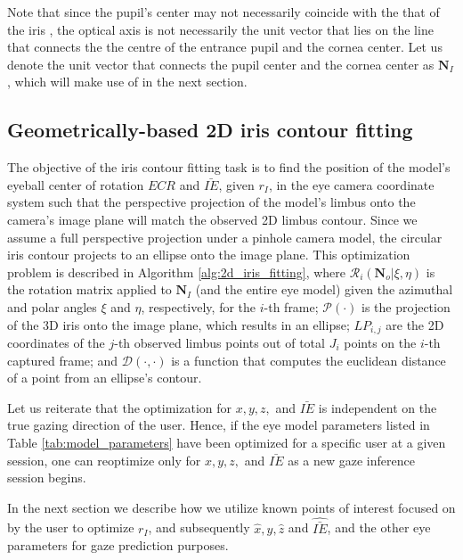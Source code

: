 \documentclass{article}
\begin{document}
Note that since the pupil's center may not necessarily coincide with the that of the iris \citep{Gross2008}, the optical axis is not necessarily the unit vector that lies on the line that connects the the centre of the entrance pupil and the cornea center. Let us denote the unit vector that connects the pupil center and the cornea center as $\textbf{N}_I$, which will make use of in the next section.


\subsection{Geometrically-based 2D iris contour fitting}
 The objective of the iris contour fitting task is to find the position of the model's eyeball center of rotation $ECR$ and $\bar{IE}$, given $r_I$, in the eye camera coordinate system such that the perspective projection of the model's limbus onto the camera's image plane will match the observed 2D limbus contour. Since we assume a full perspective projection under a pinhole camera model, the circular iris contour projects to an ellipse onto the image plane. This optimization problem is described in Algorithm \ref{alg:2d_iris_fitting}, where $\mathcal{R}_i(\textbf{N}_o| \xi, \eta)$ is the rotation matrix applied to $\textbf{N}_I$ (and the entire eye model) given the azimuthal and polar angles $\xi$ and $\eta$, respectively, for the $i$-th frame; $\mathcal{P}(\cdot)$ is the projection of the 3D iris onto the image plane, which results in an ellipse; $LP_{i,j}$ are the 2D coordinates of the $j$-th observed limbus points out of total $J_i$ points on the  $i$-th captured frame; and $\mathcal{D}(\cdot, \cdot)$ is a function that computes the euclidean distance of a point from an ellipse's contour. 

Let us reiterate that the optimization for $x,y,z,$ and $\bar{IE}$ is independent on the true gazing direction of the user.  Hence, if the eye model parameters listed in Table \ref{tab:model_parameters} have been optimized for a specific user at a given session, one can reoptimize only for $x,y,z,$ and $\bar{IE}$ as a new gaze inference session begins.

In the next section we describe how we utilize known points of interest focused on by the user to optimize $r_I$, and subsequently $\hat{x}, \hat{y}, \hat{z}$ and $\hat{\bar{IE}}$, and the other eye parameters for gaze prediction purposes.
\end{document}
